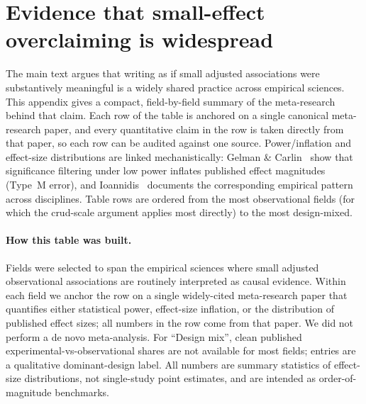 \section{Evidence that small-effect overclaiming is widespread}
\label{app:overclaim}

The main text argues that writing as if small adjusted associations were substantively meaningful is a widely shared practice across empirical sciences. This appendix gives a compact, field-by-field summary of the meta-research behind that claim. Each row of the table is anchored on a single canonical meta-research paper, and every quantitative claim in the row is taken directly from that paper, so each row can be audited against one source. Power/inflation and effect-size distributions are linked mechanistically: Gelman \& Carlin~\citep{gelman2014} show that significance filtering under low power inflates published effect magnitudes (Type~M error), and Ioannidis~\citep{ioannidis2008winner} documents the corresponding empirical pattern across disciplines. Table rows are ordered from the most observational fields (for which the crud-scale argument applies most directly) to the most design-mixed.

\paragraph{How this table was built.}
Fields were selected to span the empirical sciences where small adjusted observational associations are routinely interpreted as causal evidence. Within each field we anchor the row on a single widely-cited meta-research paper that quantifies either statistical power, effect-size inflation, or the distribution of published effect sizes; all numbers in the row come from that paper. We did not perform a de novo meta-analysis. For ``Design mix'', clean published experimental-vs-observational shares are not available for most fields; entries are a qualitative dominant-design label. All numbers are summary statistics of effect-size distributions, not single-study point estimates, and are intended as order-of-magnitude benchmarks.

